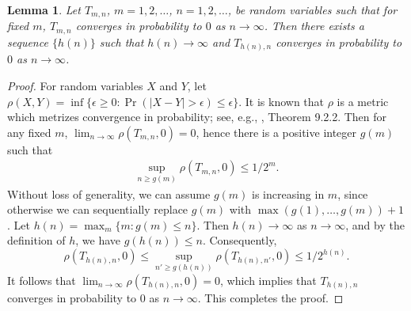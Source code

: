 \documentclass[11pt]{article}
\theoremstyle{plain}
\newtheorem{lemma}{\quad\quad Lemma}
\theoremstyle{definition}
\theoremstyle{remark}
\begin{document}
\begin{appendices}
\begin{lemma}
    Let $T_{m,n}$, $m = 1, 2,\dots$, $n = 1, 2,\dots$, be random variables such that for fixed $m$, $T_{m,n}$ converges in probability to $0$ as $n \to \infty$.
    Then there exists a sequence $\{h(n)\}$ such that $h(n) \to \infty$ and $T_{h(n), n}$ converges in probability to $0$ as $n \to \infty$.
    \label{lemma:MN}
\end{lemma}
\begin{proof}
    For random variables $X$ and $Y$, let $\rho (X, Y) = \inf\{\epsilon \geq 0: \Pr (|X - Y| > \epsilon) \leq \epsilon\}$.
    It is known that $\rho$ is a metric which metrizes convergence in probability; see, e.g., \cite{dudleyProbability}, Theorem 9.2.2.
    Then for any fixed $m$, $\lim_{n\to \infty}\rho (T_{m,n}, 0) = 0$, hence there is a positive integer $g(m)$ such that 
    \begin{align*}
        \sup_{n \geq g(m)} \rho (T_{m,n}, 0) \leq 1/2^m.
    \end{align*}
    Without loss of generality, we can assume $g(m)$ is increasing in $m$, since otherwise we can sequentially replace $g(m)$ with $\max(g(1), \dots, g(m)) + 1$.
    Let $h(n) = \max_m \{m: g(m) \leq n\} $.
    Then $h(n) \to \infty$ as $n \to \infty$, and by the definition of $h$, we have $g(h(n)) \leq n$.
    Consequently,
    $$\rho(T_{h(n), n}, 0)  \leq  \sup_{n' \geq g(h(n))}\rho(T_{h(n), n'}, 0) \leq 1/2^{h(n)}.$$
    It follows that $\lim_{n \to \infty}\rho(T_{h(n), n}, 0) = 0$, which implies that $T_{h(n), n}$ converges in probability to $0$ as $n\to \infty$.
    This completes the proof.

\end{proof}


\end{appendices}
\end{document}
